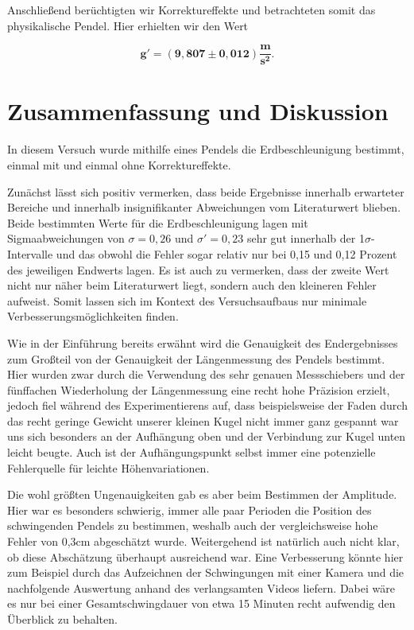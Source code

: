 \documentclass{article}
\begin{document}
Anschließend berüchtigten wir Korrektureffekte und betrachteten somit das physikalische Pendel. Hier erhielten wir den Wert

\begin{equation}
    \bm{g'} = \bm{(9,807 \pm 0,012) \frac{\textbf{m}}{\textbf{s}^2}}.
\end{equation}


\newpage
\section{Zusammenfassung und Diskussion}

In diesem Versuch wurde mithilfe eines Pendels die Erdbeschleunigung bestimmt, einmal mit und einmal ohne Korrektureffekte.

Zunächst lässt sich positiv vermerken, dass beide Ergebnisse innerhalb erwarteter Bereiche und innerhalb insignifikanter Abweichungen vom Literaturwert blieben. Beide bestimmten Werte für die Erdbeschleunigung lagen mit Sigmaabweichungen von $\sigma = 0,26$ und $\sigma' = 0,23$ sehr gut innerhalb der 1$\sigma$-Intervalle und das obwohl die Fehler sogar relativ nur bei 0,15 und 0,12 Prozent des jeweiligen Endwerts lagen. Es ist auch zu vermerken, dass der zweite Wert nicht nur näher beim Literaturwert liegt, sondern auch den kleineren Fehler aufweist. Somit lassen sich im Kontext des Versuchsaufbaus nur minimale Verbesserungsmöglichkeiten finden. 

Wie in der Einführung bereits erwähnt wird die Genauigkeit des Endergebnisses zum Großteil von der Genauigkeit der Längenmessung des Pendels bestimmt. Hier wurden zwar durch die Verwendung des sehr genauen Messschiebers und der fünffachen Wiederholung der Längenmessung eine recht hohe Präzision erzielt, jedoch fiel während des Experimentierens auf, dass beispielsweise der Faden durch das recht geringe Gewicht unserer kleinen Kugel nicht immer ganz gespannt war uns sich besonders an der Aufhängung oben und der Verbindung zur Kugel unten leicht beugte. Auch ist der Aufhängungspunkt selbst immer eine potenzielle Fehlerquelle für leichte Höhenvariationen. 

Die wohl größten Ungenauigkeiten gab es aber beim Bestimmen der Amplitude. Hier war es besonders schwierig, immer alle paar Perioden die Position des schwingenden Pendels zu bestimmen, weshalb auch der vergleichsweise hohe Fehler von 0,3cm abgeschätzt wurde. Weitergehend ist natürlich auch nicht klar, ob diese Abschätzung überhaupt ausreichend war. Eine Verbesserung könnte hier zum Beispiel durch das Aufzeichnen der Schwingungen mit einer Kamera und die nachfolgende Auswertung anhand des verlangsamten Videos liefern. Dabei wäre es nur bei einer Gesamtschwingdauer von etwa 15 Minuten recht aufwendig den Überblick zu behalten.  
\end{document}
